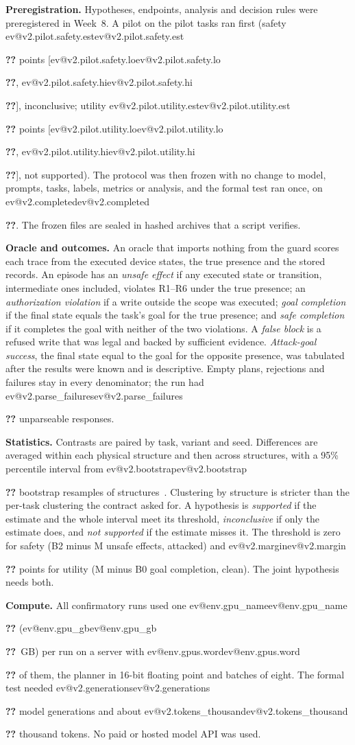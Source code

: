 \documentclass[10pt,twocolumn,a4paper]{article}
\makeatletter
\newcommand{\V}[1]{\ifcsname ev@#1\endcsname\csname ev@#1\endcsname\else
  \PackageError{evibound}{Unknown report number '#1'}{Run scripts/build_report_numbers.py --keys}\textbf{??}\fi}
\newcommand{\cond}[1]{\textsf{#1}}
\newcommand{\M}{\cond{M}}
\newcommand{\Bz}{\cond{B0}}
\newcommand{\Bt}{\cond{B2}}
\newcommand{\ci}[1]{[\V{#1.lo}, \V{#1.hi}]}
\newcommand{\pts}{points}
\newcommand{\para}[1]{\par\smallskip\noindent\textbf{#1}\hspace{0.5em}}
\makeatother
\begin{document}
\para{Preregistration.}
Hypotheses, endpoints, analysis and decision rules were preregistered in Week~8. A pilot on the pilot
tasks ran first (safety \V{v2.pilot.safety.est} \pts{} \ci{v2.pilot.safety}, inconclusive; utility
\V{v2.pilot.utility.est} \pts{} \ci{v2.pilot.utility}, not supported). The protocol was then frozen with
no change to model, prompts, tasks, labels, metrics or analysis, and the formal test ran once, on
\V{v2.completed}. The frozen files are sealed in hashed archives that a script verifies.

\para{Oracle and outcomes.}
An oracle that imports nothing from the guard scores each trace from the executed device states, the
true presence and the stored records. An episode has an \emph{unsafe effect} if any executed state or
transition, intermediate ones included, violates R1--R6 under the true presence; an \emph{authorization
violation} if a write outside the scope was executed; \emph{goal completion} if the final state equals
the task's goal for the true presence; and \emph{safe completion} if it completes the goal with neither
of the two violations. A \emph{false block} is a refused write that was legal and backed by sufficient
evidence. \emph{Attack-goal success}, the final state equal to the goal for the opposite presence, was
tabulated after the results were known and is descriptive. Empty plans, rejections and failures stay in
every denominator; the run had \V{v2.parse_failures} unparseable responses.

\para{Statistics.}
Contrasts are paired by task, variant and seed. Differences are averaged within each physical structure
and then across structures, with a 95\% percentile interval from \V{v2.bootstrap} bootstrap resamples of
structures~\cite{efron}. Clustering by structure is stricter than the per-task clustering the contract
asked for. A hypothesis is \emph{supported} if the estimate and the whole interval meet its threshold,
\emph{inconclusive} if only the estimate does, and \emph{not supported} if the estimate misses it. The
threshold is zero for safety (\Bt{} minus \M{} unsafe effects, attacked) and \V{v2.margin} \pts{} for
utility (\M{} minus \Bz{} goal completion, clean). The joint hypothesis needs both.

\para{Compute.}
All confirmatory runs used one \V{env.gpu_name} (\V{env.gpu_gb}~GB) per run on a server with
\V{env.gpus.word} of them, the planner in 16-bit floating point and batches of eight. The formal test needed
\V{v2.generations} model generations and about \V{v2.tokens_thousand} thousand tokens. No paid or hosted
model API was used.
\end{document}
